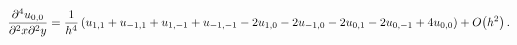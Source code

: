 \[\frac{{\partial}^{4}u_{0,0}}{{\partial}^{2}x{\partial}^{2}y}=\frac{1}{h^{4}}\,%
(u_{1,1}+u_{-1,1}+u_{1,-1}+u_{-1,-1}-2u_{1,0}-2u_{-1,0}-2u_{0,1}-2u_{0,-1}+4u_%
{0,0})+\mathop{O\/}\nolimits\!\left(h^{2}\right).\]
